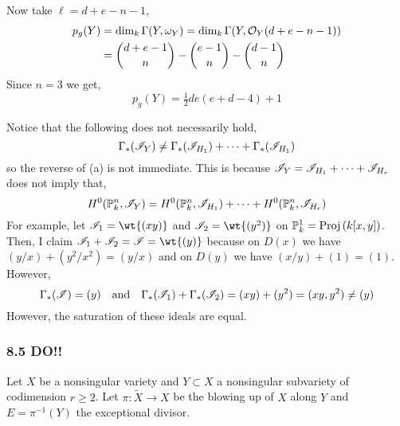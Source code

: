 \documentclass[12pt]{article}
\begin{document}
\begin{enumerate}
\begin{center}
\begin{tikzcd}[column sep = small]
\end{tikzcd}
\end{center}
Now take $\ell = d + e - n - 1$,
\begin{align*}
p_g(Y) & = \dim_k \Gamma(Y, \omega_Y) = \dim_k \Gamma(Y, \struct{Y}(d + e - n - 1)) 
\\
& = {d + e - 1 \choose n } - { e - 1 \choose n } - { d - 1 \choose n } 
\end{align*} 
Since $n = 3$ we get,
\[ p_g(Y) = \tfrac{1}{2} de (e + d - 4) + 1 \]
\end{enumerate}

\begin{rmk}
Notice that the following does not necessarily hold,
\[ \Gamma_*(\I_Y) \neq \Gamma_*(\I_{H_1}) + \cdots + \Gamma_*(\I_{H_1}) \]
so the reverse of (a) is not immediate. This is because $\I_Y = \I_{H_1} + \cdots + \I_{H_r}$ does not imply that,
\[ H^0(\P^n_k, \I_Y) = H^0(\P^n_k,\I_{H_1}) + \cdots + H^0(\P^n_k,\I_{H_r}) \]
For example, let $\I_1 = \wt{(xy)}$ and $\I_2 = \wt{(y^2)}$ on $\P^1_k = \Proj{k[x,y]}$. Then, I claim $\I_1 + \I_2 = \I = \wt{(y)}$ because on $D(x)$ we have $(y/x) + (y^2/x^2) = (y/x)$ and on $D(y)$ we have $(x/y) + (1) = (1)$. However,
\[ \Gamma_*(\I) = (y) \quad \text{and} \quad \Gamma_*(\I_1) + \Gamma_*(\I_2) = (xy) + (y^2) = (xy, y^2) \neq (y) \]
However, the saturation of these ideals are equal.
\end{rmk}

\subsubsection{8.5 DO!!}

\renewcommand{\Pic}[1]{\mathrm{Pic}(#1)}

Let $X$ be a nonsingular variety and $Y \subset X$ a nonsingular subvariety of codimension $r \ge 2$. Let $\pi : \tilde{X} \to X$ be the blowing up of $X$ along $Y$ and $E = \pi^{-1}(Y)$ the exceptional divisor.
\end{document}
